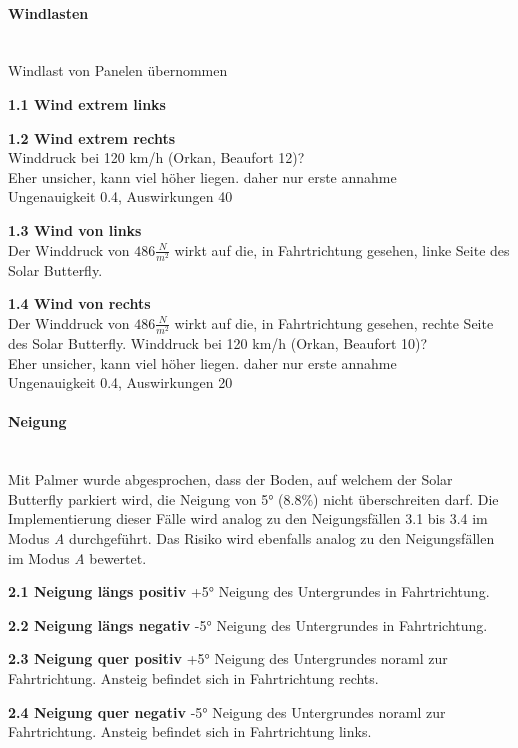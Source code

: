 \paragraph{Windlasten}\mbox{}\\
Windlast von Panelen übernommen
\begin{description}
  \item \textbf{1.1 Wind extrem links}\\
  \item \textbf{1.2 Wind extrem rechts}\\
  Winddruck bei 120 km/h (Orkan, Beaufort 12)?\\
  Eher unsicher, kann viel höher liegen. daher nur erste annahme\\
  Ungenauigkeit 0.4, Auswirkungen 40
  \item \textbf{1.3 Wind von links}\\ Der Winddruck von $486 \frac{N}{m^2}$ wirkt auf die, in Fahrtrichtung gesehen, linke Seite des Solar Butterfly.
  \item \textbf{1.4 Wind von rechts}\\ Der Winddruck von $486 \frac{N}{m^2}$ wirkt auf die, in Fahrtrichtung gesehen, rechte Seite des Solar Butterfly.
  Winddruck bei 120 km/h (Orkan, Beaufort 10)?\\
  Eher unsicher, kann viel höher liegen. daher nur erste annahme\\
  Ungenauigkeit 0.4, Auswirkungen 20
\end{description}

\paragraph{Neigung}\mbox{}\\
Mit Palmer wurde abgesprochen, dass der Boden, auf welchem der Solar Butterfly parkiert wird, die Neigung von 5° (8.8\%) nicht überschreiten darf. Die Implementierung dieser Fälle wird analog zu den Neigungsfällen 3.1 bis 3.4 im Modus \emph{A} durchgeführt. Das Risiko wird ebenfalls analog zu den Neigungsfällen im Modus \emph{A} bewertet.
\begin{description}
  \item \textbf{2.1 Neigung längs positiv} +5° Neigung des Untergrundes in Fahrtrichtung.
  \item \textbf{2.2 Neigung längs negativ} -5° Neigung des Untergrundes in Fahrtrichtung.
  \item \textbf{2.3 Neigung quer positiv} +5° Neigung des Untergrundes noraml zur Fahrtrichtung. Ansteig befindet sich in Fahrtrichtung rechts.
  \item \textbf{2.4 Neigung quer negativ} -5° Neigung des Untergrundes noraml zur Fahrtrichtung. Ansteig befindet sich in Fahrtrichtung links.
\end{description}

